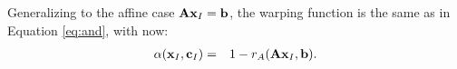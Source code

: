 
Generalizing to the affine case $\mathbf{A} \mathbf{x}_I = \mathbf{b}$, 
% 
the warping function is the same as in Equation \ref{eq:and}, with now:
\begin{eqnarray}
  \alpha(\mathbf{x}_I,  \mathbf{c}_I) &=& 1 - r_A(\mathbf{A} \mathbf{x}_I, \mathbf{b}).\label{eq:aff}
\end{eqnarray}
% 


